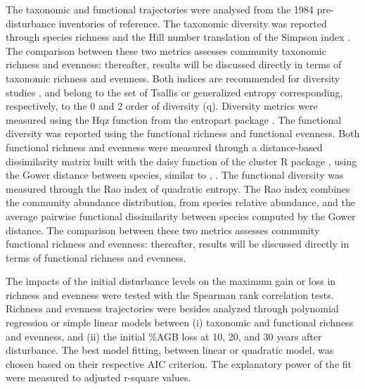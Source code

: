 \documentclass[fleqn,10pt]{ArtEcoFoG} %
\begin{document}
The taxonomic and functional trajectories were analysed from the 1984 pre-disturbance inventories of reference.
The taxonomic diversity was reported through species richness and the Hill number translation of the Simpson index \citep{Hill1973}.
The comparison between these two metrics assesses community taxonomic richness and evenness: thereafter, results will be discussed directly in terms of taxonomic richness and evenness.
Both indices are recommended for diversity studies \citep{Marcon2015}, and belong to the set of \color{red} Tsallis or generalized entropy \color{black} corresponding, respectively, to the 0 and 2 order of diversity (q).
\color{red}Diversity metrics were measured using the Hqz function from the entropart package \citep{Marcon2015}.\color{black}
The functional diversity was reported using the functional richness and functional evenness.
\color{red}Both functional richness and evenness were measured through a distance-based dissimilarity matrix built with the daisy function of the cluster R package \citep{Cluster2019}, using the Gower distance between species, similar to \citet{Herault2007a}, \citet{Herault2007b}.\color{black}
The functional diversity was measured through the Rao index of quadratic entropy.
The Rao index combines the community abundance distribution\color{red}, from species relative abundance, \color{black} and the average pairwise functional dissimilarity between species computed by the Gower distance.
\color{red}The comparison between these two metrics assesses community functional richness and evenness: thereafter, results will be discussed directly in terms of functional richness and evenness.\color{black}

The impacts of the initial disturbance levels on the maximum gain or loss in richness and evenness were tested with the Spearman rank correlation tests.
Richness and evenness trajectories were besides analyzed through polynomial regression \color{red}or simple linear models \color{black} between (i) taxonomic and functional richness and evenness, and (ii) the initial \%AGB loss at 10, 20, and 30 years after disturbance.
\color{red}The best model fitting, between linear or quadratic model, was chosen based on their respective AIC criterion.
The explanatory power of the fit were measured to adjusted r-square values.\color{black}
\end{document}
